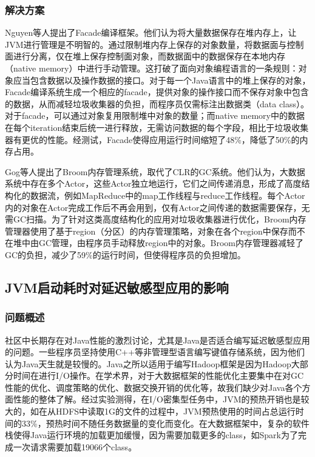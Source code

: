 \documentclass[lang=cn,11pt,a4paper,cite=authoryear]{elegantpaper}
\begin{document}
\subsubsection{解决方案}
Nguyen等人提出了Facade\cite{DBLP:conf/asplos/NguyenWBFHX15}编译框架。他们认为将大量数据保存在堆内存上，让JVM进行管理是不明智的。通过限制堆内存上保存的对象数量，将数据面与控制面进行分离，仅在堆上保存控制面对象，而数据面中的数据保存在本地内存（native memory）中进行手动管理。这打破了面向对象编程语言的一条规则：对象应当包含数据以及操作数据的接口。对于每一个Java语言中的堆上保存的对象，Facade编译系统生成一个相应的facade，提供对象的操作接口而不保存对象中包含的数据，从而减轻垃圾收集器的负担，而程序员仅需标注出数据类（data class）。对于facade，可以通过对象复用限制堆中对象的数量；而native memory中的数据在每个iteration结束后统一进行释放，无需访问数据的每个字段，相比于垃圾收集器有更优的性能。经测试，Facade使得应用运行时间缩短了48\%，降低了50\%的内存占用。

Gog等人提出了Broom\cite{DBLP:conf/hotos/GogGSVVRCMHI15}内存管理系统，取代了CLR的GC系统。他们认为，大数据系统中存在多个Actor，这些Actor独立地运行，它们之间传递消息，形成了高度结构化的数据流，例如MapReduce\cite{DBLP:journals/cacm/DeanG08}中的map工作线程与reduce工作线程。每个Actor内的对象在Actor完成工作后不再会用到，仅有Actor之间传递的数据需要保存，无需GC扫描。为了针对这类高度结构化的应用对垃圾收集器进行优化，Broom内存管理器使用了基于region（分区）的内存管理策略，对象在各个region中保存而不在堆中由GC管理，由程序员手动释放region中的对象。Broom内存管理器减轻了GC的负担，减少了59\%的运行时间，但使得程序员的负担增加。

\subsection{JVM启动耗时对延迟敏感型应用的影响}
\subsubsection{问题概述}
社区中长期存在对Java性能的激烈讨论，尤其是Java是否适合编写延迟敏感型应用的问题。一些程序员坚持使用C++等非管理型语言编写键值存储系统，因为他们认为Java天生就是较慢的。Java之所以适用于编写Hadoop框架是因为Hadoop大部分时间在进行I/O操作。在学术界，对于大数据框架的性能优化主要集中在对GC性能的优化、调度策略的优化、数据交换开销的优化等，故我们缺少对Java各个方面性能的整体了解。经过实验测得，在I/O密集型任务中，JVM的预热开销也是较大的，如在从HDFS中读取1G的文件的过程中，JVM预热使用的时间占总运行时间的33\%，预热时间不随任务数据量的变化而变化。在大数据框架中，复杂的软件栈使得Java运行环境的加载更加缓慢，因为需要加载更多的class，如Spark为了完成一次请求需要加载19066个class。
\end{document}
